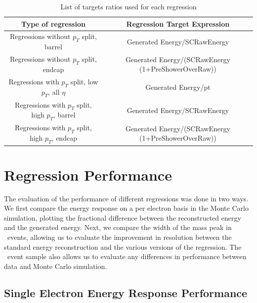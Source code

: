 \documentclass{cmspaper}
\begin{document}
\begin{table}[!ht]
\begin{center}
\begin{tabular}{|c|c|}
\hline
 Type of regression & Regression Target Expression \\
\hline 
Regressions without $p_T$ split, barrel & Generated Energy/SCRawEnergy \\ \hline
Regressions without $p_T$ split, endcap & Generated Energy/(SCRawEnergy (1+PreShowerOverRaw)) \\ \hline
Regressions with $p_T$ split, low $p_T$, all $\eta$ & Generated Energy/pt \\ \hline
Regressions with $p_T$ split, high $p_T$, barrel & Generated Energy/SCRawEnergy \\ \hline
Regressions with $p_T$ split, high $p_T$, endcap & Generated Energy/(SCRawEnergy (1+PreShowerOverRaw)) \\
\hline
\end{tabular}
\caption{List of targets ratios used for each regression}
  \label{tab:targetratios}
\end{center}
\end{table}


\section{Regression Performance}
\label{sec:regressionperformance}

The evaluation of the performance of different regressions was done in two ways. We first compare the energy response
on a per electron basis in the Monte Carlo simulation, plotting the fractional difference between the reconstructed
energy and the generated energy. Next, we compare the width of the mass peak in \ZToEE\ events, allowing us to 
evaluate the improvement in resolution between the standard energy reconstruction and the various versions of
the regression. The \ZToEE\ event sample also allows us to evaluate any differences in performance between data and
Monte Carlo simulation. 


\subsection{Single Electron Energy Response Performance}
\label{subsec:electronsamplesperformance}
\end{document}
